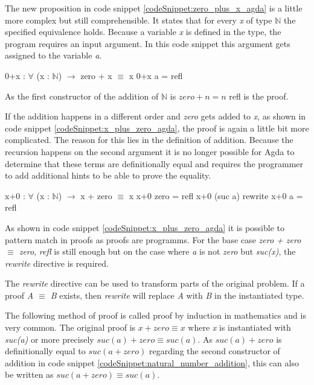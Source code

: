 The new proposition in code snippet \ref{codeSnippet:zero_plus_x_agda} is a little more complex but still comprehensible. 
It states that for every \emph{x} of type $\mathbb{N}$ the specified equivalence holds. 
Because a variable \emph{x} is defined in the type, the program requires an input argument.
In this code snippet this argument gets assigned to the variable \emph{a}.

\begin{codesnippet}[mathescape=true, caption={Proof of addition to zero in Agda}, label={codeSnippet:zero_plus_x_agda}]
0+x : $\forall$ (x : $\mathbb{N}$) $\rightarrow$ zero + x $\equiv$ x
0+x a = refl
\end{codesnippet}

As the first constructor of the addition of $\mathbb{N}$ is $zero + n = n$ refl is the proof.

If the addition happens in a different order and \emph{zero} gets added to \emph{x}, as shown in code snippet \ref{codeSnippet:x_plus_zero_agda}, the proof is again a little bit more complicated. 
The reason for this lies in the definition of addition.
Because the recursion happens on the second argument it is no longer possible for Agda to determine that these terms are definitionally equal and requires the programmer to add additional hints to be able to prove the equality.

\begin{codesnippet}[mathescape=true, caption={Proof of addition of zero in Agda}, label={codeSnippet:x_plus_zero_agda}]
x+0 : $\forall$ (x : $\mathbb{N}$) $\rightarrow$ x + zero $\equiv$ x
x+0 zero = refl
x+0 (suc a) rewrite x+0 a = refl
\end{codesnippet}

As shown in code snippet \ref{codeSnippet:x_plus_zero_agda} it is possible to pattern match in proofs as proofs are programms.
For the base case \emph{zero + zero $\equiv$ zero}, \emph{refl} is still enough but on the case where \emph{a} is not \emph{zero} but \emph{suc(x)}, the \emph{rewrite} directive is required.

The \emph{rewrite} directive can be used to transform parts of the original problem. If a proof \emph{A $\equiv$ B} exists, then \emph{rewrite} will replace \emph{A} with \emph{B} in the instantiated type.

The following method of proof is called proof by induction in mathematics and is very common.
The original proof is $x + zero \equiv x$ where \emph{x} is instantiated with \emph{suc(a)} or more precisely $suc(a) + zero \equiv suc(a)$.
As $suc(a) + zero$ is definitionally equal to $suc(a + zero)$ regarding the second constructor of addition in code snippet \ref{codeSnippet:natural_number_addition}, this can also be written as $suc(a + zero) \equiv suc(a)$.

